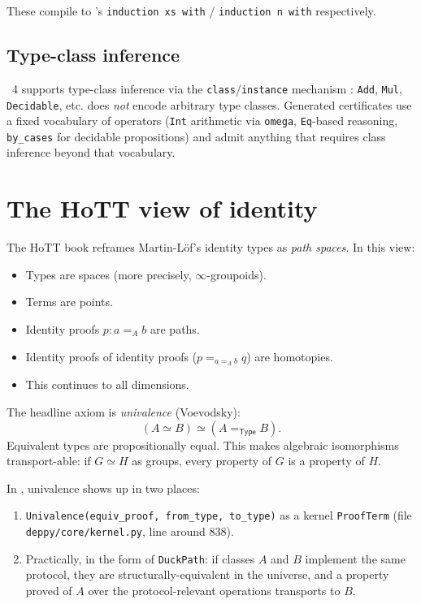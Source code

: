 These compile to \Lean{}'s \verb|induction xs with| /
\verb|induction n with| respectively.

\subsection{Type-class inference}

\Lean{}~4 supports type-class inference via the \verb|class|/\verb|instance|
mechanism \citep{LeanRefManual}: \texttt{Add}, \texttt{Mul},
\texttt{Decidable}, etc.  \Deppy{} does \emph{not} encode arbitrary
\Lean{} type classes.  Generated certificates use a fixed vocabulary
of operators (\texttt{Int} arithmetic via \texttt{omega},
\texttt{Eq}-based reasoning, \texttt{by\_cases} for decidable
propositions) and admit anything that requires class inference
beyond that vocabulary.

\section{The HoTT view of identity}
\label{sec:hott-view}

The HoTT book \citep{HoTT} reframes Martin-L\"of's identity types as
\emph{path spaces}.  In this view:
\begin{itemize}[leftmargin=1.7em]
  \item Types are spaces (more precisely, $\infty$-groupoids).
  \item Terms are points.
  \item Identity proofs $p : a =_A b$ are paths.
  \item Identity proofs of identity proofs ($p =_{a =_A b} q$) are
    homotopies.
  \item This continues to all dimensions.
\end{itemize}

The headline axiom is \emph{univalence} (Voevodsky):
\begin{equation*}
  (A \simeq B) \simeq (A =_{\mathsf{Type}} B).
\end{equation*}
Equivalent types are propositionally equal.  This makes algebraic
isomorphisms transport-able: if $G \simeq H$ as groups, every
property of $G$ is a property of $H$.

In \Deppy{}, univalence shows up in two places:
\begin{enumerate}[leftmargin=1.7em]
  \item \texttt{Univalence(equiv\_proof, from\_type, to\_type)} as a
    kernel \texttt{ProofTerm} (file \texttt{deppy/core/kernel.py}, line
    around 838).
  \item Practically, in the form of \texttt{DuckPath}: if classes
    $A$ and $B$ implement the same protocol, they are
    structurally-equivalent in the universe, and a property proved
    of $A$ over the protocol-relevant operations transports to $B$.
\end{enumerate}

